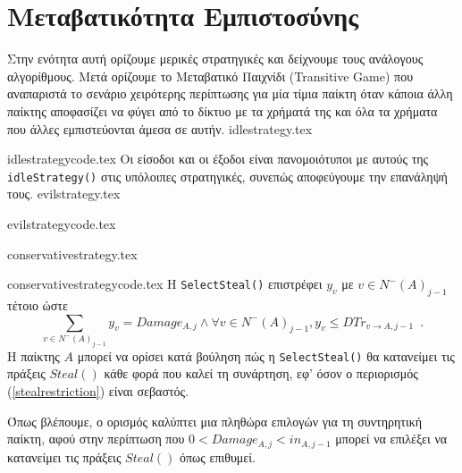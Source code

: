 \section{Μεταβατικότητα Εμπιστοσύνης}
  Στην ενότητα αυτή ορίζουμε μερικές στρατηγικές και δείχνουμε τους ανάλογους αλγορίθμους. Μετά ορίζουμε το Μεταβατικό
  Παιχνίδι (\textlatin{Transitive Game}) που αναπαριστά το σενάριο χειρότερης περίπτωσης για μία τίμια παίκτη όταν κάποια
  άλλη παίκτης αποφασίζει να φύγει από το δίκτυο με τα χρήματά της και όλα τα χρήματα που άλλες εμπιστεύονται άμεσα σε αυτήν.
  {idlestrategy.tex}

  {idlestrategycode.tex}
  Οι είσοδοι και οι έξοδοι είναι πανομοιότυποι με αυτούς της \texttt{\textlatin{idleStrategy()}} στις υπόλοιπες στρατηγικές,
  συνεπώς αποφεύγουμε την επανάληψή τους.
  {evilstrategy.tex}

  {evilstrategycode.tex}

  {conservativestrategy.tex}

  {conservativestrategycode.tex}
  Η \texttt{\textlatin{SelectSteal()}} επιστρέφει $y_v$ με $v \in N^{-}\left(A\right)_{j-1}$ τέτοιο ώστε
  \begin{equation}
  \label{stealrestriction}
     \sum\limits_{v \in N^{-}\left(A\right)_{j-1}}y_v = Damage_{A, j} \wedge \forall v \in N^{-}\left(A\right)_{j-1},
     y_v \leq DTr_{v \rightarrow A, j-1} \enspace.
  \end{equation}
  Η παίκτης $A$ μπορεί να ορίσει κατά βούληση πώς η \texttt{\textlatin{SelectSteal()}} θα κατανείμει τις πράξεις
  $Steal\left(\right)$ κάθε φορά που καλεί τη συνάρτηση, εφ' όσον ο περιορισμός (\ref{stealrestriction}) είναι σεβαστός.

  Όπως βλέπουμε, ο ορισμός καλύπτει μια πληθώρα επιλογών για τη συντηρητική παίκτη, αφού στην περίπτωση που $0 < Damage_{A,j}
  < in_{A,j-1}$ μπορεί να επιλέξει να κατανείμει τις πράξεις $Steal\left(\right)$ όπως επιθυμεί.


